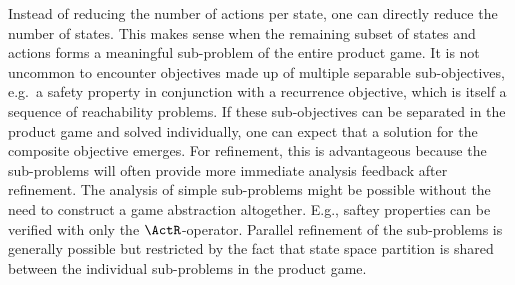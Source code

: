 Instead of reducing the number of actions per state, one can directly reduce the number of states.
This makes sense when the remaining subset of states and actions forms a meaningful sub-problem of the entire product game.
It is not uncommon to encounter objectives made up of multiple separable sub-objectives, e.g.\ a safety property in conjunction with a recurrence objective, which is itself a sequence of reachability problems.
If these sub-objectives can be separated in the product game and solved individually, one can expect that a solution for the composite objective emerges.
For refinement, this is advantageous because the sub-problems will often provide more immediate analysis feedback after refinement.
The analysis of simple sub-problems might be possible without the need to construct a game abstraction altogether.
E.g., saftey properties can be verified with only the $\ActR$-operator.
Parallel refinement of the sub-problems is generally possible but restricted by the fact that state space partition is shared between the individual sub-problems in the product game.

